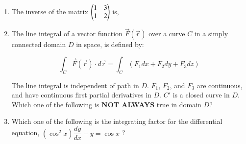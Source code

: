 \documentclass[journal,12pt,onecolumn]{IEEEtran}
\theoremstyle{remark}
\begin{document}
\begin{enumerate}
\item The inverse of the matrix $\begin{pmatrix} 1 & 3 \\ 1 & 2\end{pmatrix}$ is, 

\hfill{}

\begin{enumerate}
\end{enumerate}

\item The line integral of a vector function $\vec{F}(\vec{r})$ over a curve $C$ in a simply connected domain $D$ in space, is defined by: 

\hfill{}

\[
\int_C \vec{F}(\vec{r}) \cdot d\vec{r} = \int_C (F_1 dx + F_2 dy + F_3 dz)
\]

The line integral is independent of path in $D$. $F_1$, $F_2$, and $F_3$ are continuous, and have continuous first partial derivatives in $D$. $C'$ is a closed curve in $D$.\\

\noindent
Which one of the following is \textbf{NOT ALWAYS} true in domain $D$?

\begin{enumerate}
\end{enumerate}

\item Which one of the following is the integrating factor  for the differential equation, $(\cos^2 x)\dfrac{dy}{dx} + y = \cos x$ ? 


\end{enumerate}
\end{document}
